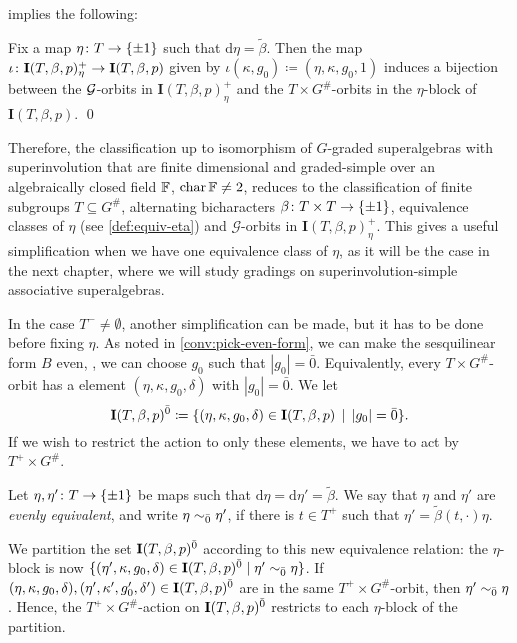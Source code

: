  implies the following:

\begin{prop}\label{prop:after-fixing-delta}
	Fix a map $\eta\colon T \to \{ \pm 1 \}$ such that $\mathrm{d}\eta = \tilde\beta$.
	Then the map $\iota\colon \mathbf{I}(T,\beta,p)_\eta^+ \to \mathbf{I}(T,\beta,p)$ given by $\iota(\kappa, g_0) \coloneqq (\eta,\kappa, g_0, 1)$ induces a bijection between the $\mathcal G$-orbits in $\mathbf{I}(T,\beta,p)_\eta^+$ and the $T\times G^\#$-orbits in the $\eta$-block of $\mathbf{I}(T,\beta,p)$. \qed
\end{prop}

Therefore, the classification up to isomorphism of $G$-graded superalgebras with superinvolution that are finite dimensional and graded-simple over an algebraically closed field $\mathbb{F}$, $\operatorname{char} \mathbb{F} \neq 2$, reduces to the classification of finite subgroups $T\subseteq G^\#$, alternating bicharacters $\beta\colon T\times T \to \{ \pm 1 \}$, equivalence classes of $\eta$ (see \cref{def:equiv-eta}) and $\mathcal G$-orbits in $\mathbf{I}(T,\beta, p)^+_\eta$.
This gives a useful simplification when we have one equivalence class of $\eta$, as it will be the case in the next chapter, where we will study gradings on superinvolution-simple associative superalgebras. 

In the case $T^- \neq \emptyset$, another simplification can be made, but it has to be done before fixing $\eta$. 
As noted in \cref{conv:pick-even-form}, we can make the sesquilinear form $B$ even, \ie, we can choose $g_0$ such that $|g_0| = \bar 0$. 
Equivalently, every $T\times G^\#$-orbit has a element $(\eta, \kappa, g_0, \delta)$ with $|g_0| = \bar 0$. 
We let 
\[
    \mathbf{I}(T, \beta, p)^{{\bar{0}}} \coloneqq \{ (\eta, \kappa, g_0, \delta) \in \mathbf{I}(T, \beta, p) \, \mid \, |g_0| = {\bar{0}}\}.
\]
If we wish to restrict the action to only these elements, we have to act by $T^+ \times G^\#$. 

\begin{defi}\label{def:equiv-eta-even}
	Let $\eta, \eta'\colon T \to \{ \pm 1 \}$ be maps such that $\mathrm{d}\eta = \mathrm{d}\eta' = \tilde\beta$.
	We say that $\eta$ and $\eta'$ are \emph{evenly equivalent}, and write $\eta \sim_{\bar{0}} \eta'$, if there is $t \in T^+$ such that $\eta' = \tilde\beta(t, \cdot) \eta$. 
\end{defi}

We partition the set $\mathbf{I}(T, \beta, p)^{{\bar{0}}}$ according to this new equivalence relation: the $\eta$-block is now $\{ (\eta', \kappa, g_0, \delta) \in \mathbf{I}(T, \beta, p)^{{\bar{0}}} \mid \eta' \sim_{\bar{0}} \eta \}$. 
If $(\eta, \kappa, g_0, \delta), (\eta', \kappa', g_0', \delta') \in \mathbf{I}(T, \beta, p)^{{\bar{0}}}$ are in the same $T^+ \times G^\#$-orbit, then $\eta' \sim_{\bar{0}} \eta$.
Hence, the $T^+\times G^\#$-action on $\mathbf{I}(T, \beta, p)^{{\bar{0}}}$ restricts to each $\eta$-block of the partition. 

